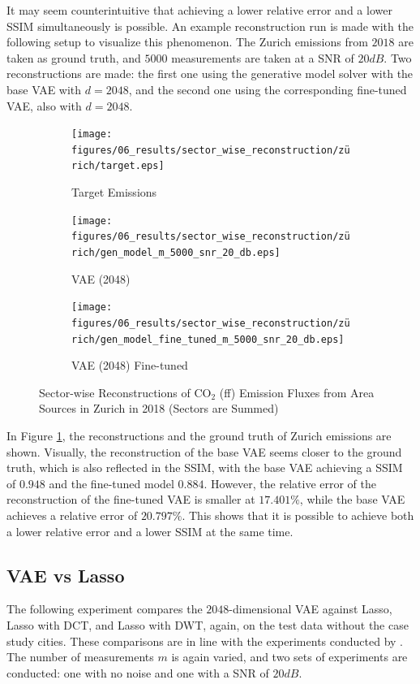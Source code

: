 It may seem counterintuitive that achieving a lower relative error and a lower \gls{SSIM} simultaneously is possible.
An example reconstruction run is made with the following setup to visualize this phenomenon.
The Zurich emissions from $2018$ are taken as ground truth, and $5000$ measurements are taken at a \gls{SNR} of $20 \unit{dB}$.
Two reconstructions are made: the first one using the generative model solver with the base \gls{VAE} with $d = 2048$, and the second one using the corresponding fine-tuned \gls{VAE}, also with $d = 2048$.

\begin{figure}
    \centering
    \begin{subfigure}{0.32\textwidth}
        \centering
        \texttt{[image: figures/06\_results/sector\_wise\_reconstruction/zürich/target.eps]}
        \caption{Target Emissions}
    \end{subfigure}
    \begin{subfigure}{0.32\textwidth}
        \centering
        \texttt{[image: figures/06\_results/sector\_wise\_reconstruction/zürich/gen\_model\_m\_5000\_snr\_20\_db.eps]}
        \caption{VAE (2048)}
    \end{subfigure}
    \begin{subfigure}{0.32\textwidth}
        \centering
        \texttt{[image: figures/06\_results/sector\_wise\_reconstruction/zürich/gen\_model\_fine\_tuned\_m\_5000\_snr\_20\_db.eps]}
        \caption{VAE (2048) Fine-tuned}
    \end{subfigure}
    \caption{Sector-wise Reconstructions of $\text{CO}_2$ (ff) Emission Fluxes from Area Sources in Zurich in 2018 (Sectors are Summed)}
    \label{fig:sector_wise_zuricch}
\end{figure}

In Figure \ref{fig:sector_wise_zuricch}, the reconstructions and the ground truth of Zurich emissions are shown.
Visually, the reconstruction of the base \gls{VAE} seems closer to the ground truth, which is also reflected in the \gls{SSIM}, with the base \gls{VAE} achieving a \gls{SSIM} of $0.948$ and the fine-tuned model $0.884$.
However, the relative error of the reconstruction of the fine-tuned \gls{VAE} is smaller at $17.401\%$, while the base \gls{VAE} achieves a relative error of $20.797\%$.
This shows that it is possible to achieve both a lower relative error and a lower \gls{SSIM} at the same time.

\subsection{VAE vs Lasso}
The following experiment compares the $2048$-dimensional \gls{VAE} against \gls{Lasso}, \gls{Lasso} with \gls{DCT}, and \gls{Lasso} with \gls{DWT}, again, on the test data without the case study cities.
These comparisons are in line with the experiments conducted by \textcite{CSUsingAI}.
The number of measurements $m$ is again varied, and two sets of experiments are conducted: one with no noise and one with a \gls{SNR} of $20 \unit{dB}$.

